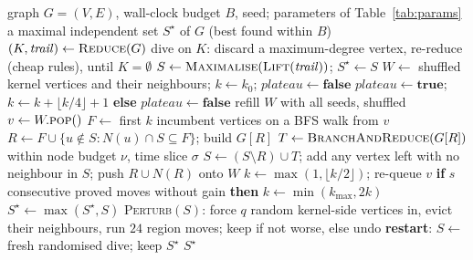 \documentclass[review,authoryear,11pt]{elsarticle}
\theoremstyle{definition}
\begin{document}
\begin{algorithm}
\caption{\textsc{Cascade}: static region-move search}
\label{alg:cascade}
\small
\begin{algorithmic}[1]
\Require graph $G=(V,E)$, wall-clock budget $B$, seed; parameters of Table~\ref{tab:params}
\Ensure a maximal independent set $S^\star$ of $G$ (best found within $B$)
\State $(K,\mathit{trail}) \gets \textsc{Reduce}(G)$ 
\State dive on $K$: discard a maximum-degree vertex, re-reduce (cheap rules), until $K=\emptyset$
\State $S \gets \textsc{Maximalise}(\textsc{Lift}(\mathit{trail}))$;\; $S^\star \gets S$
\State $W \gets$ shuffled kernel vertices and their neighbours;\; $k \gets k_0$;\; $\mathit{plateau}\gets\textbf{false}$
  \Repeat {}
     
       $\mathit{plateau}\gets\textbf{true}$;\; $k \gets k + \lfloor k/4\rfloor + 1$ \textbf{else} $\mathit{plateau}\gets\textbf{false}$
      \EndIf
      \State refill $W$ with all seeds, shuffled
    \EndIf
    \State $v \gets W.\textsc{pop}()$
    \State $F \gets$ first $k$ incumbent vertices on a BFS walk from $v$ 
    \State $R \gets F \cup \{u \notin S : N(u) \cap S \subseteq F\}$;\; build $G[R]$
    \State $T \gets \textsc{BranchAndReduce}(G[R])$ within node budget $\nu$, time slice $\sigma$
      \State $S \gets (S \setminus R) \cup T$;\; add any vertex left with no neighbour in $S$; push $R\cup N(R)$ onto $W$
    \EndIf
     $k \gets \max(1,\lfloor k/2\rfloor)$;\; re-queue $v$
     \textbf{if} $s$ consecutive proved moves without gain \textbf{then} $k \gets \min(k_{\max},2k)$
    \EndIf
  \State $S^\star \gets \max(S^\star, S)$
  \State \textsc{Perturb}$(S)$: force $q$ random kernel-side vertices in, evict their neighbours, run $24$ region moves; keep if not worse, else undo
    \State \textbf{restart}: $S \gets$ fresh randomised dive; keep $S^\star$
  \EndIf
\EndWhile
\State \Return $S^\star$
\end{algorithmic}
\end{algorithm}
\end{document}
